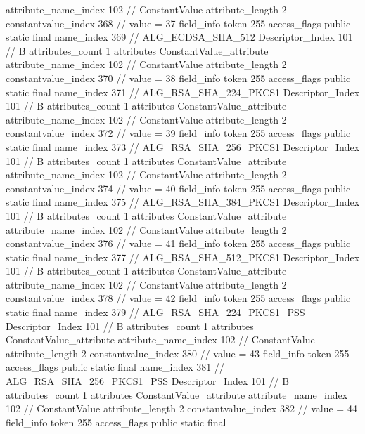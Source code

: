 {{{{{{{					attribute_name_index	102		// ConstantValue
					attribute_length	2
					constantvalue_index	368		// value = 37
				}
				}
			}
			field_info {
				token	255
				access_flags	public static final
				name_index	369		// ALG_ECDSA_SHA_512
				Descriptor_Index	101		// B
				attributes_count	1
				attributes {
				ConstantValue_attribute {
					attribute_name_index	102		// ConstantValue
					attribute_length	2
					constantvalue_index	370		// value = 38
				}
				}
			}
			field_info {
				token	255
				access_flags	public static final
				name_index	371		// ALG_RSA_SHA_224_PKCS1
				Descriptor_Index	101		// B
				attributes_count	1
				attributes {
				ConstantValue_attribute {
					attribute_name_index	102		// ConstantValue
					attribute_length	2
					constantvalue_index	372		// value = 39
				}
				}
			}
			field_info {
				token	255
				access_flags	public static final
				name_index	373		// ALG_RSA_SHA_256_PKCS1
				Descriptor_Index	101		// B
				attributes_count	1
				attributes {
				ConstantValue_attribute {
					attribute_name_index	102		// ConstantValue
					attribute_length	2
					constantvalue_index	374		// value = 40
				}
				}
			}
			field_info {
				token	255
				access_flags	public static final
				name_index	375		// ALG_RSA_SHA_384_PKCS1
				Descriptor_Index	101		// B
				attributes_count	1
				attributes {
				ConstantValue_attribute {
					attribute_name_index	102		// ConstantValue
					attribute_length	2
					constantvalue_index	376		// value = 41
				}
				}
			}
			field_info {
				token	255
				access_flags	public static final
				name_index	377		// ALG_RSA_SHA_512_PKCS1
				Descriptor_Index	101		// B
				attributes_count	1
				attributes {
				ConstantValue_attribute {
					attribute_name_index	102		// ConstantValue
					attribute_length	2
					constantvalue_index	378		// value = 42
				}
				}
			}
			field_info {
				token	255
				access_flags	public static final
				name_index	379		// ALG_RSA_SHA_224_PKCS1_PSS
				Descriptor_Index	101		// B
				attributes_count	1
				attributes {
				ConstantValue_attribute {
					attribute_name_index	102		// ConstantValue
					attribute_length	2
					constantvalue_index	380		// value = 43
				}
				}
			}
			field_info {
				token	255
				access_flags	public static final
				name_index	381		// ALG_RSA_SHA_256_PKCS1_PSS
				Descriptor_Index	101		// B
				attributes_count	1
				attributes {
				ConstantValue_attribute {
					attribute_name_index	102		// ConstantValue
					attribute_length	2
					constantvalue_index	382		// value = 44
				}
				}
			}
			field_info {
				token	255
				access_flags	public static final
}}}}}
